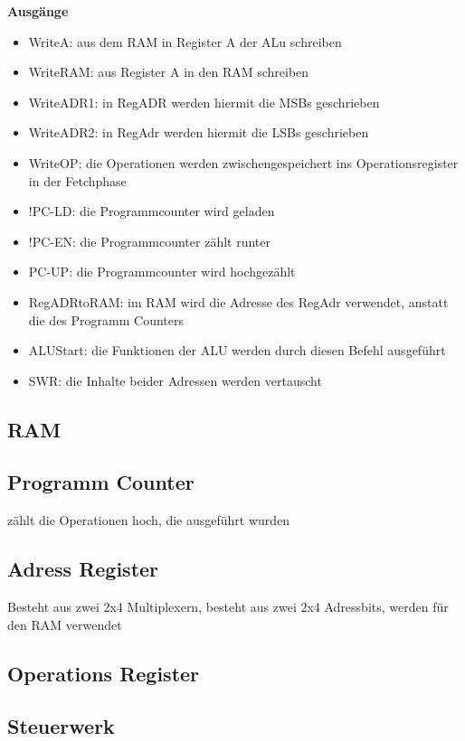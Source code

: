 \textbf{Ausgänge}
\begin{itemize}
    \item WriteA: aus dem RAM in Register A der ALu schreiben
    \item WriteRAM: aus Register A in den RAM schreiben
    \item WriteADR1: in RegADR werden hiermit die MSBs geschrieben
    \item WriteADR2: in RegAdr werden hiermit die LSBs geschrieben
    \item WriteOP: die Operationen werden zwischengespeichert ins Operationsregister in der Fetchphase
    \item !PC-LD: die Programmcounter wird geladen
    \item !PC-EN: die Programmcounter zählt runter
    \item PC-UP: die Programmcounter wird hochgezählt
    \item RegADRtoRAM: im RAM wird die Adresse des RegAdr verwendet, anstatt die des Programm Counters
    \item ALUStart: die Funktionen der ALU werden durch diesen Befehl ausgeführt
    \item SWR: die Inhalte beider Adressen werden vertauscht
\end{itemize}

\subsection{RAM}
\label{sec:ram}



\subsection{Programm Counter}
\label{sec:programm-counter}

zählt die Operationen hoch, die ausgeführt wurden

\subsection{Adress Register}
\label{sec: adress-register}

Besteht aus zwei 2x4 Multiplexern, besteht aus zwei 2x4 Adressbits, werden für den RAM verwendet

\subsection{Operations Register}
\label{sec: operations-register}

\subsection{Steuerwerk}
\label{sec:steuerwerk}